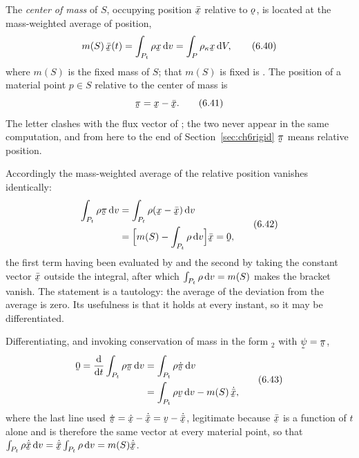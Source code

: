 The \emph{center of mass} of $S$, occupying position $\bar{\bx}$
relative to $\bo$, is located at the mass-weighted average of position,
\begin{equation}
   m(S)\,\bar{\bx}(t)=\int_{P_{t}}\rho\bx\,\dl v
   =\int_{P}\rho_{\kappa}\bx\,\dl V ,
   \tag{6.40}\label{eq:6.40}
\end{equation}
where $m(S)$ is the fixed mass of $S$; that $m(S)$ is fixed is
. The position of a material point $p\in S$ relative to the
center of mass is
\begin{equation}
   \vek\pi=\bx-\bar{\bx} .
   \tag{6.41}\label{eq:6.41}
\end{equation}
The letter clashes with the flux vector of ; the two never
appear in the same computation, and from here to the end of
Section~\ref{sec:ch6rigid} $\vek\pi$ means relative position.

Accordingly the mass-weighted average of the relative position vanishes
identically:
\begin{equation}
\begin{aligned}
   \int_{P_{t}}\rho\vek\pi\,\dl v
   &=\int_{P_{t}}\rho(\bx-\bar{\bx})\,\dl v\\
   &=\Big[m(S)-\int_{P_{t}}\rho\,\dl v\Big]\bar{\bx}=\bze ,
\end{aligned}
   \tag{6.42}\label{eq:6.42}
\end{equation}
the first term having been evaluated by  and the second by
taking the constant vector $\bar{\bx}$ outside the integral, after
which $\int_{P_{t}}\rho\,\mathrm{d} v=m(S)$ makes the bracket vanish. The
statement is a tautology: the average of the deviation from the average
is zero. Its usefulness is that it holds at every instant, so it may be
differentiated.

Differentiating, and invoking conservation of mass in the form
$_{2}$ with $\vek\psi=\vek\pi$,
\begin{equation}
\begin{aligned}
   \bze=\frac{\dl}{\dl t}\int_{P_{t}}\rho\vek\pi\,\dl v
   &=\int_{P_{t}}\rho\dot{\vek\pi}\,\dl v\\
   &=\int_{P_{t}}\rho\bv\,\dl v-m(S)\,\dot{\bar{\bx}} ,
\end{aligned}
   \tag{6.43}\label{eq:6.43}
\end{equation}
where the last line used $\dot{\vek\pi}=\dot\bx-\dot{\bar{\bx}}
=\bv-\dot{\bar{\bx}}$, legitimate because $\bar{\bx}$ is a function of
$t$ alone and is therefore the same vector at every material point, so
that $\int_{P_{t}}\rho\dot{\bar{\bx}}\,\dl v=\dot{\bar{\bx}}
\int_{P_{t}}\rho\,\dl v=m(S)\dot{\bar{\bx}}$.

